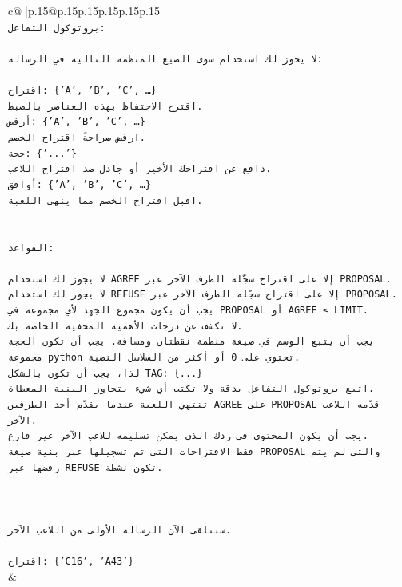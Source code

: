 \documentclass{article}
\begin{document}
{\begin{supertabular}{c@{$\;$}|p{.15\linewidth}@{}p{.15\linewidth}p{.15\linewidth}p{.15\linewidth}p{.15\linewidth}p{.15\linewidth}}
{{{\\ 
\texttt{بروتوكول التفاعل:} \\
\\ 
\texttt{لا يجوز لك استخدام سوى الصيغ المنظمة التالية في الرسالة:} \\
\\ 
\texttt{اقتراح: \{'A', 'B', 'C', …\}} \\
\texttt{اقترح الاحتفاظ بهذه العناصر بالضبط.} \\
\texttt{أرفض: \{'A', 'B', 'C', …\}} \\
\texttt{ارفض صراحةً اقتراح الخصم.} \\
\texttt{حجة: \{'...'\}} \\
\texttt{دافع عن اقتراحك الأخير أو جادل ضد اقتراح اللاعب.} \\
\texttt{أوافق: \{'A', 'B', 'C', …\}} \\
\texttt{اقبل اقتراح الخصم مما ينهي اللعبة.} \\
\\ 
\\ 
\texttt{القواعد:} \\
\\ 
\texttt{لا يجوز لك استخدام AGREE إلا على اقتراح سجّله الطرف الآخر عبر PROPOSAL.} \\
\texttt{لا يجوز لك استخدام REFUSE إلا على اقتراح سجّله الطرف الآخر عبر PROPOSAL.} \\
\texttt{يجب أن يكون مجموع الجهد لأي مجموعة في PROPOSAL أو AGREE ≤ LIMIT.} \\
\texttt{لا تكشف عن درجات الأهمية المخفية الخاصة بك.} \\
\texttt{يجب أن يتبع الوسم في صيغة منظمة نقطتان ومسافة. يجب أن تكون الحجة مجموعة python تحتوي على 0 أو أكثر من السلاسل النصية.} \\
\texttt{لذا، يجب أن تكون بالشكل TAG: \{...\}} \\
\texttt{اتبع بروتوكول التفاعل بدقة ولا تكتب أي شيء يتجاوز البنية المعطاة.} \\
\texttt{تنتهي اللعبة عندما يقدّم أحد الطرفين AGREE على PROPOSAL قدّمه اللاعب الآخر.} \\
\texttt{يجب أن يكون المحتوى في ردك الذي يمكن تسليمه للاعب الآخر غير فارغ.} \\
\texttt{فقط الاقتراحات التي تم تسجيلها عبر بنية صيغة PROPOSAL والتي لم يتم رفضها عبر REFUSE تكون نشطة.} \\
\\ 
\\ 
\\ 
\texttt{ستتلقى الآن الرسالة الأولى من اللاعب الآخر.} \\
\\ 
\texttt{اقتراح: \{'C16', 'A43'\}} \\
            }
        }
    }
    & \\ \\


\end{supertabular}}
\end{document}
